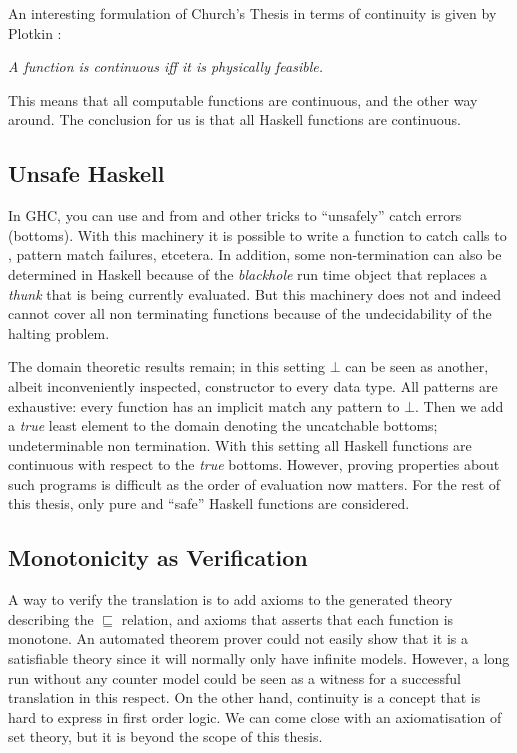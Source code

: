An interesting formulation of Church's Thesis in terms of continuity
is given by Plotkin \cite{domains}:

\begin{center}
\emph{A function is continuous iff it is physically feasible.}
\end{center}

This means that all computable functions are continuous, and the other
way around. The conclusion for us is that all Haskell functions are
continuous.

\subsection{Unsafe Haskell}
In GHC, you can use  and  from
 and other tricks to ``unsafely'' catch errors
(bottoms). With this machinery it is possible to write a function
 to catch calls to , pattern
match failures, etcetera. In addition, some non-termination can also
be determined in Haskell because of the \emph{blackhole} run time
object that replaces a \emph{thunk} that is being currently
evaluated. But this machinery does not and indeed cannot cover all non
terminating functions because of the undecidability of the halting
problem.

The domain theoretic results remain; in this setting $\bot$ can be
seen as another, albeit inconveniently inspected, constructor to every
data type. All patterns are exhaustive: every function has an implicit
match any pattern to $\bot$.  Then we add a \emph{true} least element
to the domain denoting the uncatchable bottoms; undeterminable non
termination. With this setting all Haskell functions are continuous
with respect to the \emph{true} bottoms. However, proving properties
about such programs is difficult as the order of evaluation now
matters. For the rest of this thesis, only pure and ``safe'' Haskell
functions are considered.

\subsection{Monotonicity as Verification}

A way to verify the translation is to add axioms to the generated
theory describing the $\sqsubseteq$ relation, and axioms that asserts
that each function is monotone. An automated theorem prover could not
easily show that it is a satisfiable theory since it will normally
only have infinite models. However, a long run without any counter
model could be seen as a witness for a successful translation in this
respect.  On the other hand, continuity is a concept that is hard to
express in first order logic. We can come close with an axiomatisation
of set theory, but it is beyond the scope of this thesis.
